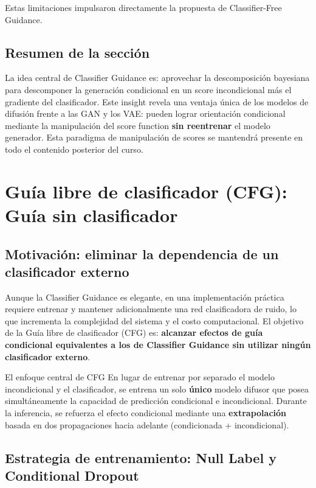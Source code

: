 \documentclass[a4paper]{article}
\begin{document}
Estas limitaciones impulsaron directamente la propuesta de Classifier-Free Guidance.

\subsection{Resumen de la sección}

La idea central de Classifier Guidance es: aprovechar la descomposición bayesiana para descomponer la generación condicional en un score incondicional más el gradiente del clasificador. Este insight revela una ventaja única de los modelos de difusión frente a las GAN y los VAE: pueden lograr orientación condicional mediante la manipulación del score function \textbf{sin reentrenar} el modelo generador. Esta paradigma de manipulación de scores se mantendrá presente en todo el contenido posterior del curso.

\newpage
\section{Guía libre de clasificador (CFG): Guía sin clasificador}

\subsection{Motivación: eliminar la dependencia de un clasificador externo}

Aunque la Classifier Guidance es elegante, en una implementación práctica requiere entrenar y mantener adicionalmente una red clasificadora de ruido, lo que incrementa la complejidad del sistema y el costo computacional. El objetivo de la Guía libre de clasificador (CFG) es: \textbf{alcanzar efectos de guía condicional equivalentes a los de Classifier Guidance sin utilizar ningún clasificador externo}.

\begin{importantbox}{El enfoque central de CFG}
En lugar de entrenar por separado el modelo incondicional y el clasificador, se entrena un solo \textbf{único} modelo difusor que posea simultáneamente la capacidad de predicción condicional e incondicional. Durante la inferencia, se refuerza el efecto condicional mediante una \textbf{extrapolación} basada en dos propagaciones hacia adelante (condicionada + incondicional).
\end{importantbox}

\subsection{Estrategia de entrenamiento: Null Label y Conditional Dropout}
\end{document}

